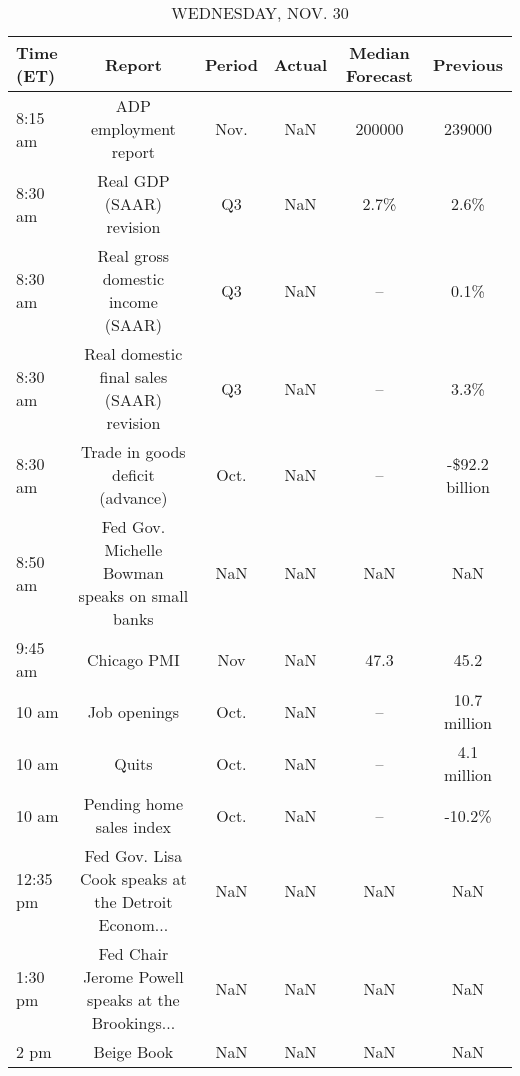\documentclass{article}%
\begin{document}
\begin{table}[htbp]%
\caption{WEDNESDAY, NOV. 30}%
\centering%
\begin{adjustbox}{width=1\textwidth}%
\begin{tabular}{lccccc}
\toprule
Time (ET) &                                             Report & Period & Actual & Median Forecast &       Previous \\
\midrule
  8:15 am &                              ADP employment report &   Nov. &    NaN &          200000 &         239000 \\
  8:30 am &                           Real GDP (SAAR) revision &     Q3 &    NaN &            2.7\% &           2.6\% \\
  8:30 am &                  Real gross domestic income (SAAR) &     Q3 &    NaN &              -- &           0.1\% \\
  8:30 am &          Real domestic final sales (SAAR) revision &     Q3 &    NaN &              -- &           3.3\% \\
  8:30 am &                   Trade in goods deficit (advance) &   Oct. &    NaN &              -- & -\$92.2 billion \\
  8:50 am &     Fed Gov. Michelle Bowman speaks on small banks &    NaN &    NaN &             NaN &            NaN \\
  9:45 am &                                        Chicago PMI &    Nov &    NaN &            47.3 &           45.2 \\
    10 am &                                       Job openings &   Oct. &    NaN &              -- &   10.7 million \\
    10 am &                                              Quits &   Oct. &    NaN &              -- &    4.1 million \\
    10 am &                           Pending home sales index &   Oct. &    NaN &              -- &         -10.2\% \\
 12:35 pm & Fed Gov. Lisa Cook speaks at the Detroit Econom... &    NaN &    NaN &             NaN &            NaN \\
  1:30 pm & Fed Chair Jerome Powell speaks at the Brookings... &    NaN &    NaN &             NaN &            NaN \\
     2 pm &                                         Beige Book &    NaN &    NaN &             NaN &            NaN \\
\bottomrule
\end{tabular}
%
\end{adjustbox}%
\end{table}
\end{document}
